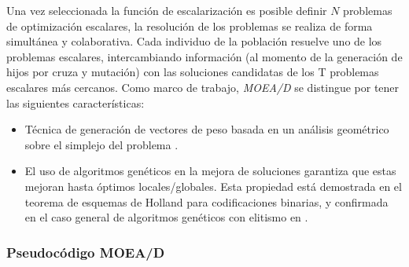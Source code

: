 \documentclass[letterpaper,10pt]{article}
\begin{document}
Una vez seleccionada la función de escalarización es posible definir $N$ problemas de optimización escalares, la resolución de los problemas se realiza de forma simultánea
y colaborativa. Cada individuo de la población resuelve uno de los problemas escalares, intercambiando información (al momento de la generación de hijos por cruza y mutación) con las soluciones candidatas de los T problemas escalares más cercanos.
Como marco de trabajo, \emph{MOEA/D} se distingue por tener las siguientes características:

 \begin{itemize}
 \item Técnica de generación de vectores de peso basada en un análisis geométrico sobre el simplejo del problema \cite{mie99,Das:1998:NIN:588907.589322, Messac2003}.
 \item El uso de algoritmos genéticos en la mejora de soluciones garantiza que estas mejoran hasta óptimos locales/globales. Esta propiedad está demostrada en el teorema de esquemas de Holland \cite{Holland:1992:ANA:531075} para codificaciones binarias, y confirmada en el caso general de algoritmos genéticos con elitismo en \cite{rudolph1994convergence}.
 \end{itemize}


\subsubsection{Pseudocódigo MOEA/D}

\end{document}

